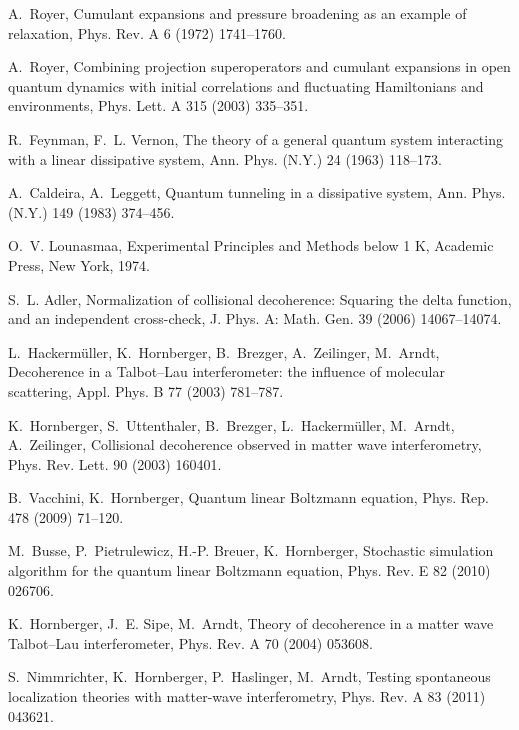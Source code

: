 \documentclass[3p,sort&compress,12pt]{elsarticle}
\begin{document}
\begin{thebibliography}{100}
A.~Royer, Cumulant expansions and pressure broadening as an example of
  relaxation, Phys. Rev. A 6 (1972) 1741--1760.

A.~Royer, Combining projection superoperators and cumulant expansions in open
  quantum dynamics with initial correlations and fluctuating {H}amiltonians and
  environments, Phys. Lett. A 315 (2003) 335--351.

R.~Feynman, F.~L. Vernon, The theory of a general quantum system interacting
  with a linear dissipative system, Ann. Phys. (N.Y.) 24 (1963) 118--173.

A.~Caldeira, A.~Leggett, Quantum tunneling in a dissipative system, Ann. Phys.
  (N.Y.) 149 (1983) 374--456.

O.~V. Lounasmaa, Experimental Principles and Methods below 1 K, Academic Press,
  New York, 1974.

S.~L. Adler, Normalization of collisional decoherence: Squaring the delta
  function, and an independent cross-check, J. Phys. A: Math. Gen. 39 (2006)
  14067--14074.

L.~Hackerm{\"u}ller, K.~Hornberger, B.~Brezger, A.~Zeilinger, M.~Arndt,
  Decoherence in a {T}albot--{L}au interferometer: the influence of molecular
  scattering, Appl. Phys. B 77 (2003) 781--787.

K.~Hornberger, S.~Uttenthaler, B.~Brezger, L.~Hackerm{\"u}ller, M.~Arndt,
  A.~Zeilinger, Collisional decoherence observed in matter wave interferometry,
  Phys. Rev. Lett. 90 (2003) 160401.

B.~Vacchini, K.~Hornberger, Quantum linear {B}oltzmann equation, Phys. Rep. 478
  (2009) 71--120.

M.~Busse, P.~Pietrulewicz, H.-P. Breuer, K.~Hornberger, Stochastic simulation
  algorithm for the quantum linear {B}oltzmann equation, Phys. Rev. E 82 (2010)
  026706.

K.~Hornberger, J.~E. Sipe, M.~Arndt, Theory of decoherence in a matter wave
  {T}albot--{L}au interferometer, Phys. Rev. A 70 (2004) 053608.

S.~Nimmrichter, K.~Hornberger, P.~Haslinger, M.~Arndt, Testing spontaneous
  localization theories with matter-wave interferometry, Phys. Rev. A 83 (2011)
  043621.


\end{thebibliography}
\end{document}
